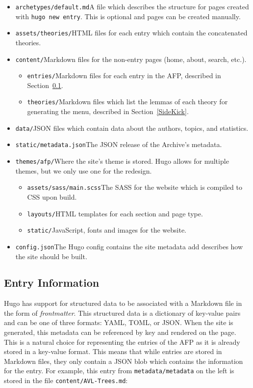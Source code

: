 \documentclass[bsc,frontabs,oneside,singlespacing,parskip,deptreport,logo]{infthesis}
\begin{document}
\begin{itemize}
    \item \texttt{archetypes/default.md}\quad A file which describes the structure for pages created with \verb|hugo new entry|. This is optional and pages can be created manually.
    \item \texttt{assets/theories/}\quad HTML files for each entry which contain the concatenated theories.
    \item \texttt{content/}\quad Markdown files for the non-entry pages (home, about, search, etc.).
    \begin{itemize}
        \item \texttt{entries/}\quad Markdown files for each entry in the AFP, described in Section~\ref{entry-information}.
        \item \texttt{theories/}\quad Markdown files which list the lemmas of each theory for generating the menu, described in Section~\ref{SideKick}.
    \end{itemize}
    \item \texttt{data/}\quad JSON files which contain data about the authors, topics, and statistics.
    \item \texttt{static/metadata.json}\quad The JSON release of the Archive's metadata.
    \item \texttt{themes/afp/}\quad Where the site's theme is stored. Hugo allows for multiple themes, but we only use one for the redesign.
    \begin{itemize}
        \item \texttt{assets/sass/main.scss}\quad The SASS for the website which is compiled to CSS upon build.
        \item \texttt{layouts/}\quad HTML templates for each section and page type.
        \item \texttt{static/}\quad JavaScript, fonts and images for the website.
    \end{itemize}
    \item \texttt{config.json}\quad The Hugo config contains the site metadata add describes how the site should be built.
\end{itemize}

\subsection{Entry Information} \label{entry-information}

Hugo has support for structured data to be associated with a Markdown file in the form of \emph{frontmatter}. This structured data is a dictionary of key-value pairs and can be one of three formats: YAML, TOML, or JSON. When the site is generated, this metadata can be referenced by key and rendered on the page. This is a natural choice for representing the entries of the AFP as it is already stored in a key-value format. This means that while entries are stored in Markdown files, they only contain a JSON blob which contains the information for the entry. For example, this entry from \verb|metadata/metadata| on the left is stored in the file \verb|content/AVL-Trees.md|: 
\end{document}
